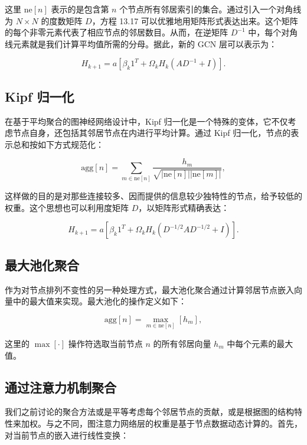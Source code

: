 \documentclass[lang=cn,newtx,10pt,scheme=chinese]{elegantbook}
\begin{document}
这里 \(\text{ne}[n]\) 表示的是包含第 \(n\) 个节点所有邻居索引的集合。通过引入一个对角线为 \(N \times N\) 的度数矩阵 \(D\)，方程 13.17 可以优雅地用矩阵形式表达出来。这个矩阵的每个非零元素代表了相应节点的邻居数目。从而，在逆矩阵 \(D^{-1}\) 中，每个对角线元素就是我们计算平均值所需的分母。据此，新的 GCN 层可以表示为：

\begin{equation}
H_{k+1} = a \left[ \beta_k 1^T + \Omega_k H_k (AD^{-1} + I) \right]. 
\end{equation}
\subsection{Kipf 归一化}
在基于平均聚合的图神经网络设计中，Kipf 归一化是一个特殊的变体，它不仅考虑节点自身，还包括其邻居节点在内进行平均计算。通过 Kipf 归一化，节点的表示总和按如下方式规范化：

\begin{equation}
\text{agg}[n] = \sum_{m \in \text{ne}[n]} \frac{h_m}{\sqrt{|\text{ne}[n]||\text{ne}[m]|}}, 
\end{equation}

这样做的目的是对那些连接较多、因而提供的信息较少独特性的节点，给予较低的权重。这个思想也可以利用度矩阵 \(D\)，以矩阵形式精确表达：

\begin{equation}
H_{k+1} = a \left[ \beta_k 1^T + \Omega_k H_k (D^{-1/2} A D^{-1/2} + I) \right]. 
\end{equation}

\subsection{最大池化聚合}
作为对节点排列不变性的另一种处理方式，最大池化聚合通过计算邻居节点嵌入向量中的最大值来实现。最大池化的操作定义如下：

\begin{equation}
\text{agg}[n] = \max_{m \in \text{ne}[n]} \left[ h_m \right], 
\end{equation}

这里的 \(\max[\cdot]\) 操作符选取当前节点 \(n\) 的所有邻居向量 \(h_m\) 中每个元素的最大值。

\subsection{通过注意力机制聚合}

我们之前讨论的聚合方法或是平等考虑每个邻居节点的贡献，或是根据图的结构特性来加权。与之不同，图注意力网络层的权重是基于节点数据动态计算的。首先，对当前节点的嵌入进行线性变换：
\end{document}
